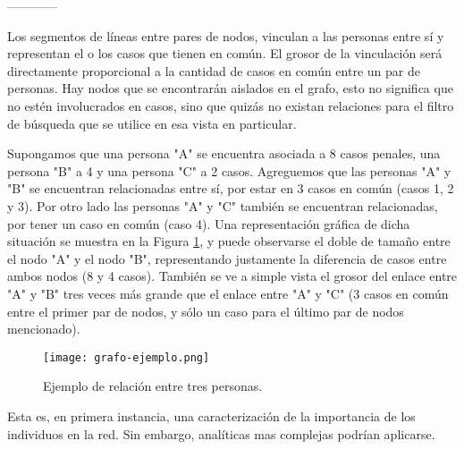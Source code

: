 ------------

Los segmentos de líneas entre pares de nodos, vinculan a las personas entre sí y representan el o los casos que tienen en común. El grosor de la vinculación será directamente proporcional a la cantidad de casos en común entre un par de personas. Hay nodos que se encontrarán aislados en el grafo, esto no significa que no estén involucrados en casos, sino que quizás no existan relaciones para el filtro de búsqueda que se utilice en esa vista en particular.

Supongamos que una persona "A" se encuentra asociada a 8 casos penales, una persona "B" a 4 y una persona "C" a 2 casos. Agreguemos que las personas "A" y "B" se encuentran relacionadas entre sí, por estar en 3 casos en común (casos 1, 2 y 3). Por otro lado las personas "A" y "C" también se encuentran relacionadas, por tener un caso en común (caso 4).  Una representación gráfica de dicha situación se muestra en la Figura \ref{fig:grafode2}, y puede observarse el doble de tamaño entre el nodo "A" y el nodo "B", representando justamente la diferencia de casos entre ambos nodos (8 y 4 casos). También se ve a simple vista el grosor del enlace entre "A" y "B" tres veces más grande que el enlace entre "A" y "C" (3 casos en común entre el primer par de nodos, y sólo un caso para el último par de nodos mencionado). 
\begin{figure}
	\centering
	\texttt{[image: grafo-ejemplo.png]}
	\caption{Ejemplo de relación entre tres personas.}
	\label{fig:grafode2}
\end{figure}

Esta es, en primera instancia, una caracterización de la importancia de los individuos en la red.
Sin embargo, analíticas mas complejas podrían aplicarse.